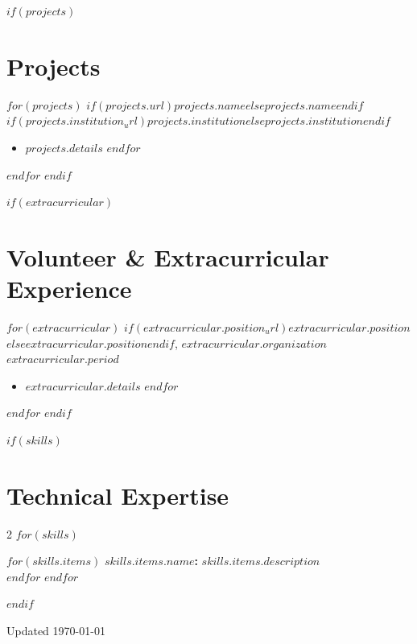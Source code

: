 \documentclass[10.5pt,a4paper]{article}
\newcommand{\daterange}[1]{\textbf{#1}}
\begin{document}
$if(projects)$
\section*{Projects}
$for(projects)$
\noindent\textbf{$if(projects.url)$\href{$projects.url$}{$projects.name$}$else$$projects.name$$endif$} \hfill \textit{$if(projects.institution_url)$\href{$projects.institution_url$}{$projects.institution$}$else$$projects.institution$$endif$}
\begin{itemize}
	$for(projects.details)$
	\item $projects.details$
	      $endfor$
\end{itemize}
\vspace{-0.1cm}
$endfor$
$endif$

$if(extracurricular)$
\section*{Volunteer \& Extracurricular Experience}
$for(extracurricular)$
\noindent\textbf{$if(extracurricular.position_url)$\href{$extracurricular.position_url$}{$extracurricular.position$}$else$$extracurricular.position$$endif$}, $extracurricular.organization$ \hfill \daterange{$extracurricular.period$}
\begin{itemize}
	$for(extracurricular.details)$
	\item $extracurricular.details$
	      $endfor$
\end{itemize}
\vspace{-0.1cm}
$endfor$
$endif$

$if(skills)$
\section*{Technical Expertise}

\begin{multicols}{2}
	$for(skills)$
	\vspace{3pt}

	$for(skills.items)$
	\noindent\textbf{$skills.items.name$:} $skills.items.description$\\[2pt]
	$endfor$
	\vspace{0.5pt}
	$endfor$
\end{multicols}
$endif$

\vfill
\begin{center}
	\footnotesize{Updated \today}
\end{center}
\end{document}

